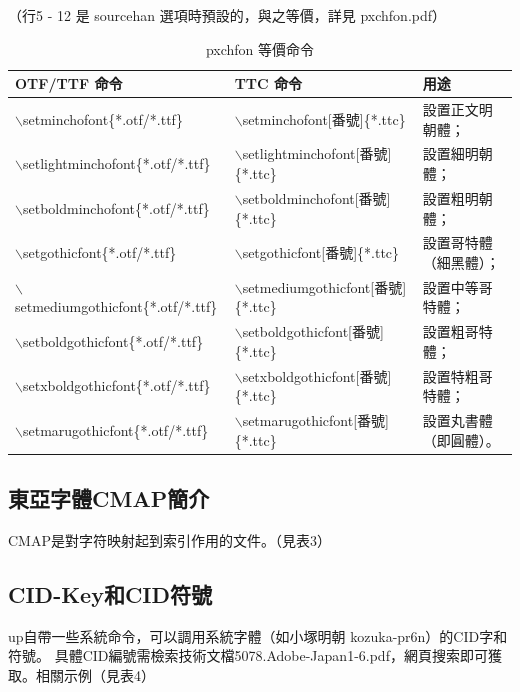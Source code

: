（行5 - 12 是 sourcehan 選項時預設的，與之等價，詳見 pxchfon.pdf）

\begin{table}[H]
\begin{center}
\caption{pxchfon 等價命令}
{\fontsize{8pt}{12}\selectfont\ttfamily
\begin{tabular}{|l|l|l|}
 \hline
 OTF/TTF 命令 & TTC 命令 & 用途 \\ \hline
$\backslash$setminchofont\{*.otf/*.ttf\} & $\backslash$setminchofont[番號]\{*.ttc\} & 設置正文明朝體；\\
$\backslash$setlightminchofont\{*.otf/*.ttf\} & $\backslash$setlightminchofont[番號]\{*.ttc\} & 設置細明朝體；\\
$\backslash$setboldminchofont\{*.otf/*.ttf\} & $\backslash$setboldminchofont[番號]\{*.ttc\} & 設置粗明朝體；\\
$\backslash$setgothicfont\{*.otf/*.ttf\} & $\backslash$setgothicfont[番號]\{*.ttc\} & 設置哥特體（細黑體）；\\
$\backslash$setmediumgothicfont\{*.otf/*.ttf\} & $\backslash$setmediumgothicfont[番號]\{*.ttc\} & 設置中等哥特體；\\
$\backslash$setboldgothicfont\{*.otf/*.ttf\} & $\backslash$setboldgothicfont[番號]\{*.ttc\} & 設置粗哥特體；\\
$\backslash$setxboldgothicfont\{*.otf/*.ttf\} & $\backslash$setxboldgothicfont[番號]\{*.ttc\} & 設置特粗哥特體；\\
$\backslash$setmarugothicfont\{*.otf/*.ttf\} & $\backslash$setmarugothicfont[番號]\{*.ttc\} & 設置丸書體（即圓體）。\\ \hline
\end{tabular} }
\end{center}
\end{table}


\subsection{東亞字體CMAP簡介}
\par{}CMAP是對字符映射起到索引作用的文件。（見表3）

\subsection{CID-Key和CID符號}

\par{}{up\LaTeXe}自帶一些系統命令，可以調用系統字體（如小塚明朝 kozuka-pr6n）的CID字和符號。
具體CID編號需檢索技術文檔{5078.Adobe-Japan1-6.pdf}，網頁搜索即可獲取。相關示例（見表4）


